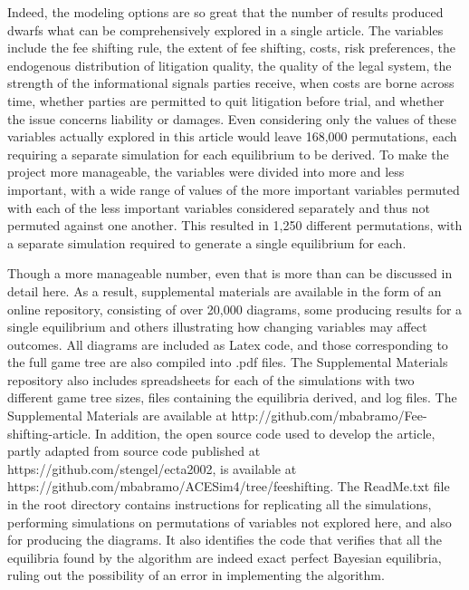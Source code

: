 \documentclass{article}
\begin{document}
Indeed, the modeling options are so great that the number of results produced dwarfs what can be comprehensively explored in a single article. The variables include the fee shifting rule, the extent of fee shifting, costs, risk preferences, the endogenous distribution of litigation quality, the quality of the legal system, the strength of the informational signals parties receive, when costs are borne across time, whether parties are permitted to quit litigation before trial, and whether the issue concerns liability or damages. Even considering only the values of these variables actually explored in this article would leave 168,000 permutations, each requiring a separate simulation for each equilibrium to be derived. To make the project more manageable, the variables were divided into more and less important, with a wide range of values of the more important variables permuted with each of the less important variables considered separately and thus not permuted against one another. This resulted in 1,250 different permutations, with a separate simulation required to generate a single equilibrium for each. 

Though a more manageable number, even that is more than can be discussed in detail here. As a result, supplemental materials are available in the form of an online repository, consisting of over 20,000 diagrams, some producing results for a single equilibrium and others illustrating how changing variables may affect outcomes. All diagrams are included as Latex code, and those corresponding to the full game tree are also compiled into .pdf files. The Supplemental Materials repository also includes spreadsheets for each of the simulations with two different game tree sizes, files containing the equilibria derived, and log files. The Supplemental Materials are available at http://github.com/mbabramo/Fee-shifting-article. In addition, the open source code used to develop the article, partly adapted from source code published at https://github.com/stengel/ecta2002, is available at https://github.com/mbabramo/ACESim4/tree/feeshifting. The ReadMe.txt file in the root directory contains instructions for replicating all the simulations, performing simulations on permutations of variables not explored here, and also for producing the diagrams.  It also identifies the code that verifies that all the equilibria found by the algorithm are indeed exact perfect Bayesian equilibria, ruling out the possibility of an error in implementing the algorithm.
\end{document}

